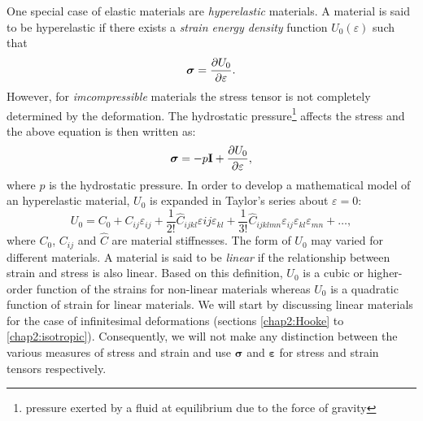 One special case of elastic materials are \emph{hyperelastic} materials. A material is said to be hyperelastic if there exists a \emph{strain energy density} function $U_0(\varepsilon)$ such that
\begin{equation}
\label{chap2:energy}
\boldsymbol \sigma = \dfrac{\partial U_0}{\partial \varepsilon}.
\end{equation}
However, for \emph{imcompressible} materials the stress tensor is not completely determined by the deformation. The hydrostatic pressure\footnote{pressure exerted by a fluid at equilibrium due to the force of gravity} affects the stress and the above equation is then written as:
\begin{equation}
\label{chap2:energy2}
\boldsymbol \sigma = -p \mathbf{I} + \dfrac{\partial U_0}{\partial \varepsilon},
\end{equation}
where $p$ is the hydrostatic pressure. In order to develop a mathematical model of an hyperelastic material, $U_0$ is expanded in Taylor's series about $\varepsilon = 0$:
\begin{equation}
U_0 = C_0 + C_{ij}\varepsilon_{ij} + \frac{1}{2!}\hat{C}_{ijkl}\varepsilon{ij}\varepsilon_{kl} + \frac{1}{3!}\hat{C}_{ijklmn}\varepsilon_{ij}\varepsilon_{kl}\varepsilon_{mn} + \ldots , 
\end{equation}
where $C_0$, $C_{ij}$ and $\hat{C}$ are material stiffnesses. The form of $U_0$ may varied for different materials. A material is said to be \emph{linear} if the relationship between strain and stress is also linear. Based on this definition, $U_0$ is a cubic or higher-order function of the strains for non-linear materials whereas $U_0$ is a quadratic function of strain for linear materials. We will start by discussing linear materials for the case of infinitesimal deformations (sections \ref{chap2:Hooke} to \ref{chap2:isotropic}). Consequently, we will not make any distinction between the various measures of stress and strain and use $\boldsymbol \sigma$ and $\boldsymbol \varepsilon$ for stress and strain tensors respectively. 
	
